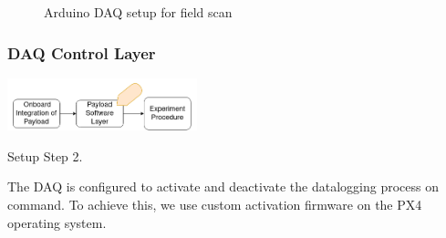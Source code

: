 \begin{figure}[!h]
    \raggedright 
    \caption{Arduino DAQ setup for field scan}
    \label{connections:arduino}
\end{figure}
 

\pagebreak
\subsubsection{DAQ Control Layer}  

\begin{marginfigure}%
    \raggedright
    {\includegraphics[width=5.5cm]{images/stage_system/drone_setup/payload_onboard2.png}}
    \caption{Setup Step 2.}
    \label{fig:zone_scan_prep2}
\end{marginfigure}


The DAQ is configured to activate and deactivate the datalogging process on command. To achieve this, we use custom activation firmware on the PX4 operating system.  

